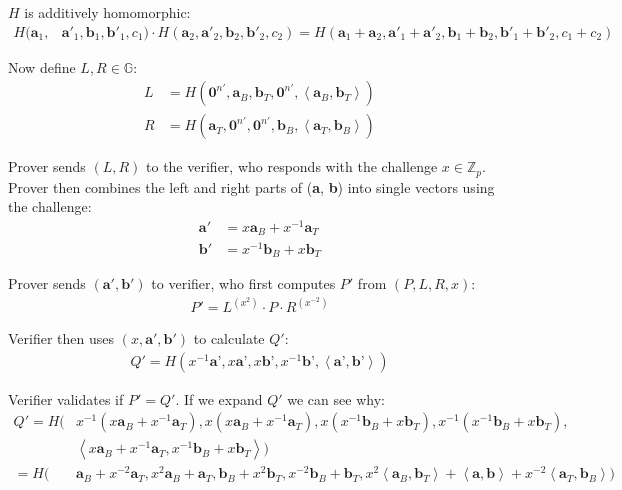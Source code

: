 \documentclass{article}
\begin{document}
$H$ is additively homomorphic:
\begin{align}
  H(\textbf{a}_1, & \textbf{a}'_1, \textbf{b}_1, \textbf{b}'_1, c_1) \cdot H(\textbf{a}_2, \textbf{a}'_2, \textbf{b}_2, \textbf{b}'_2, c_2) = H(\textbf{a}_1 + \textbf{a}_2, \textbf{a}'_1 + \textbf{a}'_2, \textbf{b}_1 + \textbf{b}_2, \textbf{b}'_1 + \textbf{b}'_2, c_1 + c_2)
\end{align}

Now define $L, R \in \mathbb{G}$:
\begin{align}
  L &= H(\textbf{0}^{n'}, \textbf{a}_{B}, \textbf{b}_{T}, \textbf{0}^{n'}, \left<\textbf{a}_{B}, \textbf{b}_{T}\right>)\\
  R &= H(\textbf{a}_{T}, \textbf{0}^{n'}, \textbf{0}^{n'}, \textbf{b}_{B}, \left<\textbf{a}_{T}, \textbf{b}_{B}\right>)
\end{align}

Prover sends $(L, R)$ to the verifier, who responds with the challenge $x \in \mathbb{Z}_p$.  Prover then combines the left and right parts of (\textbf{a}, \textbf{b}) into single vectors using the challenge:
\begin{align}
  \textbf{a}' &= x \textbf{a}_{B} + x^{-1} \textbf{a}_{T}\\
  \textbf{b}' &= x^{-1} \textbf{b}_{B} + x \textbf{b}_{T}
\end{align}

Prover sends $(\textbf{a}', \textbf{b}')$ to verifier, who first computes $P'$ from $(P, L, R, x)$:
\begin{align}
  P' = L^{(x^2)} \cdot P \cdot R^{(x^{-2})}
\end{align}

Verifier then uses $(x, \textbf{a}', \textbf{b}')$ to calculate $Q'$:
\begin{align}
  Q' = H(x^{-1} \textbf{a'}, x \textbf{a'}, x \textbf{b'}, x^{-1} \textbf{b'}, \left<\textbf{a'}, \textbf{b'}\right>)
\end{align}

Verifier validates if $P' = Q'$.  If we expand $Q'$ we can see why:
\begin{align}
  Q' = H(&x^{-1}(x \textbf{a}_{B} + x^{-1} \textbf{a}_{T}), x(x \textbf{a}_{B} + x^{-1} \textbf{a}_{T}),
         x(x^{-1} \textbf{b}_{B} + x \textbf{b}_{T}), x^{-1}(x^{-1} \textbf{b}_{B} + x \textbf{b}_{T}),\nonumber\\
         &\left<x \textbf{a}_{B} + x^{-1} \textbf{a}_{T}, x^{-1} \textbf{b}_{B} + x \textbf{b}_{T}\right>)\nonumber\\
     = H(&\textbf{a}_{B} + x^{-2} \textbf{a}_{T}, x^2 \textbf{a}_{B} + \textbf{a}_{T},
          \textbf{b}_{B} + x^2 \textbf{b}_{T}, x^{-2} \textbf{b}_{B} + \textbf{b}_{T},
          x^2 \left<\textbf{a}_{B}, \textbf{b}_{T}\right> + \left<\textbf{a}, \textbf{b}\right> + x^{-2} \left<\textbf{a}_{T}, \textbf{b}_{B}\right>)
\end{align}
\end{document}
